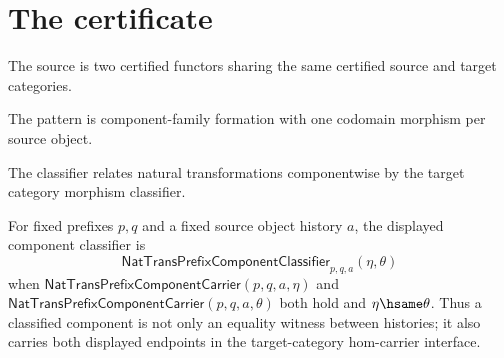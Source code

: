 \section{The certificate}

\begin{definition}
\label{def:nattrans-source-specification}
The source is two certified functors sharing the same certified source and target categories.
\end{definition}

\begin{definition}
\label{def:nattrans-pattern-specification}
The pattern is component-family formation with one codomain morphism per source object.
\end{definition}

\begin{definition}
\label{def:nattrans-classifier-specification}
The classifier relates natural transformations componentwise by the target category morphism classifier.
\end{definition}

\begin{definition}
\label{def:nattrans-prefix-component-classifier}
For fixed prefixes $p,q$ and a fixed source object history $a$, the displayed
component classifier is
$$
\mathsf{NatTransPrefixComponentClassifier}_{p,q,a}(\eta,\theta)
$$
when $\mathsf{NatTransPrefixComponentCarrier}(p,q,a,\eta)$ and
$\mathsf{NatTransPrefixComponentCarrier}(p,q,a,\theta)$ both hold and
$\eta\hsame\theta$. Thus a classified component is not only an equality
witness between histories; it also carries both displayed endpoints in the
target-category hom-carrier interface.
\end{definition}


